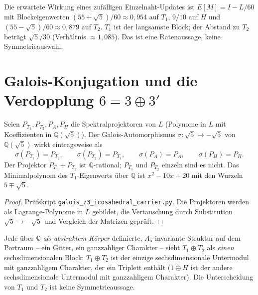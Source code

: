 \begin{remark}[Dämpfungsraten, \EM/\BM]
Die erwartete Wirkung eines zufälligen Einzelnaht-Updates ist
$E[M]=I-L/60$ mit Blockeigenwerten $(55+\sqrt5)/60\approx0{,}954$ auf $T_1$,
$9/10$ auf $H$ und $(55-\sqrt5)/60\approx0{,}879$ auf $T_2$. $T_1$ ist der
langsamste Block; der Abstand zu $T_2$ beträgt $\sqrt5/30$
(Verhältnis $\approx1{,}085$). Das ist eine Ratenaussage, keine Symmetrieauswahl.
\end{remark}

\section[Galois-Konjugation und die Verdopplung 6 = 3 + 3']{Galois-Konjugation und die Verdopplung $6=3\oplus3'$}

\begin{theorem}\label{thm:galois}
Seien $P_{T_1},P_{T_2},P_A,P_H$ die Spektralprojektoren von $L$ (Polynome in
$L$ mit Koeffizienten in $\mathbb{Q}(\sqrt5)$). Der Galois-Automorphismus
$\sigma:\sqrt5\mapsto-\sqrt5$ von $\mathbb{Q}(\sqrt5)$ wirkt eintragsweise als
\[
  \sigma(P_{T_1})=P_{T_2},\qquad \sigma(P_{T_2})=P_{T_1},\qquad
  \sigma(P_A)=P_A,\qquad \sigma(P_H)=P_H .
\]
Der Projektor $P_{T_1}+P_{T_2}$ ist $\mathbb{Q}$-rational; $P_{T_1}$ und
$P_{T_2}$ einzeln sind es nicht. Das Minimalpolynom des $T_1$-Eigenwerts
über $\mathbb{Q}$ ist $x^2-10x+20$ mit den Wurzeln $5\mp\sqrt5$.
\end{theorem}

\begin{proof}
Prüfskript \texttt{galois\_z3\_icosahedral\_carrier.py}. Die Projektoren
werden als Lagrange-Polynome in $L$ gebildet, die Vertauschung durch
Substitution $\sqrt5\to-\sqrt5$ und Vergleich der Matrizen geprüft.
\end{proof}

\begin{corollary}\label{cor:sechs}
Jede über $\mathbb{Q}$ \emph{als abstraktem Körper} definierte,
$A_5$-invariante Struktur auf dem Portraum -- ein Gitter, ein ganzzahliger
Charakter -- sieht $T_1\oplus T_2$ als \emph{einen} sechsdimensionalen
Block; $T_1\oplus T_2$ ist der einzige sechsdimensionale Untermodul mit
ganzzahligem Charakter, der ein Triplett enthält ($1\oplus H$ ist der
andere sechsdimensionale Untermodul mit ganzzahligem Charakter). Die
Unterscheidung von $T_1$ und $T_2$ ist keine Symmetrieaussage.
\end{corollary}

